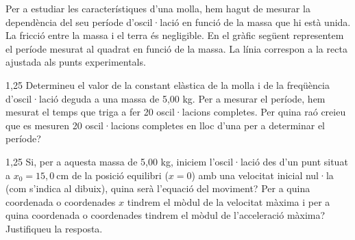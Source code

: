 Per a estudiar les característiques d'una molla, hem hagut de mesurar la dependència del seu període d'oscil·lació en funció de la massa que hi està unida. La fricció entre la massa i el terra és negligible. En el gràfic següent representem el període mesurat al quadrat en funció de la massa. La línia correspon a la recta ajustada als punts experimentals.


\begin{apartat}{1,25}
Determineu el valor de la constant elàstica de la molla i de la freqüència d'oscil·lació deguda a una massa de 5,00 kg. Per a mesurar el període, hem mesurat el temps que triga a fer 20 oscil·lacions completes. Per quina raó creieu que es mesuren 20 oscil·lacions completes en lloc d'una per a determinar el període?
\end{apartat}


\begin{apartat}{1,25}
Si, per a aquesta massa de 5,00 kg, iniciem l'oscil·lació des d'un punt situat a $x_0 = 15,0\ \mathrm{cm}$ de la posició equilibri ($x = 0$) amb una velocitat inicial nul·la (com s'indica al dibuix), quina serà l'equació del moviment? Per a quina coordenada o coordenades $x$ tindrem el mòdul de la velocitat màxima i per a quina coordenada o coordenades tindrem el mòdul de l'acceleració màxima? Justifiqueu la resposta.
\end{apartat}
